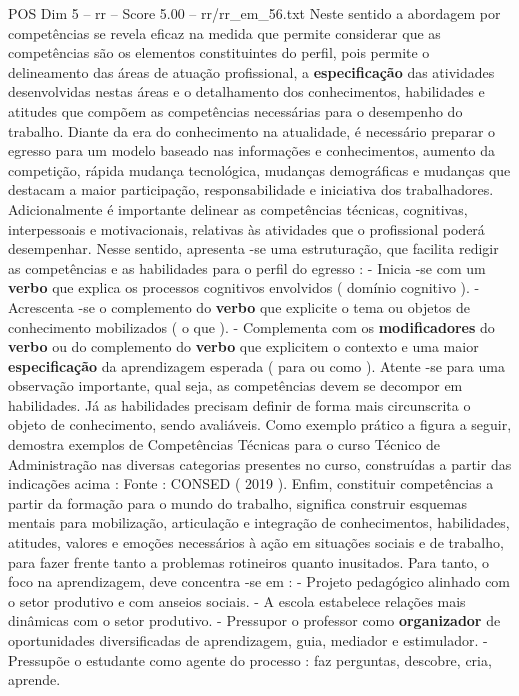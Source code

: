 \begin{textsample}{POS Dim 5 – rr – Score 5.00 – rr/rr\_em\_56.txt}
Neste sentido a abordagem por competências se revela eficaz na medida que permite considerar que as competências são os elementos constituintes do perfil, pois permite o delineamento das áreas de atuação profissional, a \textbf{especificação} das atividades desenvolvidas nestas áreas e o detalhamento dos conhecimentos, habilidades e atitudes que compõem as competências necessárias para o desempenho do trabalho.
Diante da era do conhecimento na atualidade, é necessário preparar o egresso para um modelo baseado nas informações e conhecimentos, aumento da competição, rápida mudança tecnológica, mudanças demográficas e mudanças que destacam a maior participação, responsabilidade e iniciativa dos trabalhadores.
Adicionalmente é importante delinear as competências técnicas, cognitivas, interpessoais e motivacionais, relativas às atividades que o profissional poderá desempenhar.
Nesse sentido, apresenta -se uma estruturação, que facilita redigir as competências e as habilidades para o perfil do egresso : - Inicia -se com um \textbf{verbo} que explica os processos cognitivos envolvidos ( domínio cognitivo ). - Acrescenta -se o complemento do \textbf{verbo} que explicite o tema ou objetos de conhecimento mobilizados ( o que ). - Complementa com os \textbf{modificadores} do \textbf{verbo} ou do complemento do \textbf{verbo} que explicitem o contexto e uma maior \textbf{especificação} da aprendizagem esperada ( para ou como ).
Atente -se para uma observação importante, qual seja, as competências devem se decompor em habilidades.
Já as habilidades precisam definir de forma mais circunscrita o objeto de conhecimento, sendo avaliáveis.
Como exemplo prático a figura a seguir, demostra exemplos de Competências Técnicas para o curso Técnico de Administração nas diversas categorias presentes no curso, construídas a partir das indicações acima : Fonte : CONSED ( 2019 ).
Enfim, constituir competências a partir da formação para o mundo do trabalho, significa construir esquemas mentais para mobilização, articulação e integração de conhecimentos, habilidades, atitudes, valores e emoções necessários à ação em situações sociais e de trabalho, para fazer frente tanto a problemas rotineiros quanto inusitados.
Para tanto, o foco na aprendizagem, deve concentra -se em : - Projeto pedagógico alinhado com o setor produtivo e com anseios sociais. - A escola estabelece relações mais dinâmicas com o setor produtivo. - Pressupor o professor como \textbf{organizador} de oportunidades diversificadas de aprendizagem, guia, mediador e estimulador. - Pressupõe o estudante como agente do processo : faz perguntas, descobre, cria, aprende.

\end{textsample}
